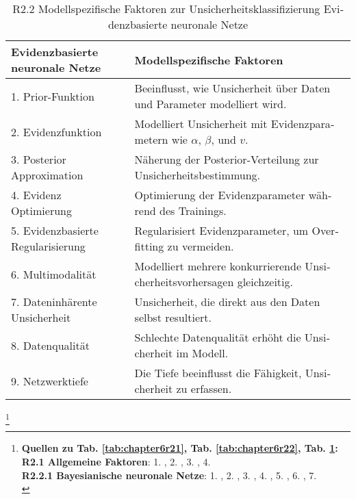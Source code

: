 \begin{otherlanguage}{ngerman}
\begin{table}[!htpb]
  \centering
  \footnotesize
  \begin{tabularx}{\textwidth}{|l|X|}
    \hline
    \textbf{\gls{Evidenzbasierte neuronale Netze}} & \textbf{Modellspezifische Faktoren} \\
    \hline
    1. Prior-Funktion & Beeinflusst, wie Unsicherheit über Daten und Parameter modelliert wird. \\
    \hline
    2. Evidenzfunktion & Modelliert Unsicherheit mit Evidenzparametern wie \( \alpha \), \( \beta \), und \( v \). \\
    \hline
    3. Posterior Approximation & Näherung der Posterior-Verteilung zur Unsicherheitsbestimmung. \\
    \hline
    4. Evidenz Optimierung & Optimierung der Evidenzparameter während des Trainings. \\
    \hline
    5. Evidenzbasierte Regularisierung & Regularisiert Evidenzparameter, um Overfitting zu vermeiden. \\
    \hline
    6. Multimodalität & Modelliert mehrere konkurrierende Unsicherheitsvorhersagen gleichzeitig. \\
    \hline
    7. Dateninhärente Unsicherheit & Unsicherheit, die direkt aus den Daten selbst resultiert. \\
    \hline
    8. Datenqualität & Schlechte Datenqualität erhöht die Unsicherheit im Modell. \\
    \hline
    9. Netzwerktiefe & Die Tiefe beeinflusst die Fähigkeit, Unsicherheit zu erfassen. \\
    \hline
  \end{tabularx}
  \caption{R2.2 Modellspezifische Faktoren zur Unsicherheitsklassifizierung \gls{Evidenzbasierte neuronale Netze}}\label{tab:chapter6r23}
\end{table}

\footnote{%
\begin{minipage}[t]{\textwidth}
\scriptsize
\textbf{Quellen zu Tab. \ref{tab:chapter6r21}, Tab. \ref{tab:chapter6r22}, Tab. \ref{tab:chapter6r23}:}\\[0.125em]
\textbf{R2.1 Allgemeine Faktoren}: 
1. \parencite[S.~47–52]{AndreasKreutz2022},
2. \parencite[S.~54]{AndreasKreutz2022},
3. \parencite[S.~56–58]{AndreasKreutz2022},
4. \parencite[S.~60]{AndreasKreutz2022}\\[0.125em]

\textbf{R2.2.1 Bayesianische neuronale Netze}: 
1. \parencite[Kap.~2.3]{gal2016uncertainty},
2. \parencite[Kap.~3]{blundell2015weight},
3. \parencite[S.~40–41]{gal2016uncertainty},
4. \parencite[S.~41–42]{gal2016uncertainty},
5. \parencite[Kap.~7.4]{rasmussen2006gaussian},
6. \parencite[S.~16]{bishop2006pattern},
7. \parencite[S.~29–31]{gal2016uncertainty}\\[0.125em]


\end{minipage}}
\end{otherlanguage}
